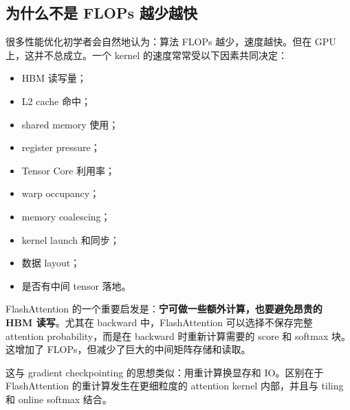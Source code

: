 \subsection{为什么不是 FLOPs 越少越快}
\label{subsec:why-fewer-flops-not-always-faster}

很多性能优化初学者会自然地认为：算法 FLOPs 越少，速度越快。但在 GPU 上，这并不总成立。一个 kernel 的速度常常受以下因素共同决定：

\begin{itemize}
\item HBM 读写量；
\item L2 cache 命中；
\item shared memory 使用；
\item register pressure；
\item Tensor Core 利用率；
\item warp occupancy；
\item memory coalescing；
\item kernel launch 和同步；
\item 数据 layout；
\item 是否有中间 tensor 落地。
\end{itemize}

FlashAttention 的一个重要启发是：\textbf{宁可做一些额外计算，也要避免昂贵的 HBM 读写}。尤其在 backward 中，FlashAttention 可以选择不保存完整 attention probability，而是在 backward 时重新计算需要的 score 和 softmax 块。这增加了 FLOPs，但减少了巨大的中间矩阵存储和读取。

这与 gradient checkpointing 的思想类似：用重计算换显存和 IO。区别在于 FlashAttention 的重计算发生在更细粒度的 attention kernel 内部，并且与 tiling 和 online softmax 结合。


